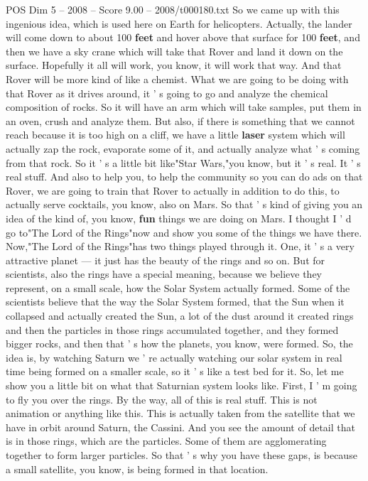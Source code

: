 \begin{textsample}{POS Dim 5 – 2008 – Score 9.00 – 2008/t000180.txt}
So we came up with this ingenious idea, which is used here on Earth for helicopters.
Actually, the lander will come down to about 100 \textbf{feet} and hover above that surface for 100 \textbf{feet}, and then we have a sky crane which will take that Rover and land it down on the surface.
Hopefully it all will work, you know, it will work that way.
And that Rover will be more kind of like a chemist.
What we are going to be doing with that Rover as it drives around, it ' s going to go and analyze the chemical composition of rocks.
So it will have an arm which will take samples, put them in an oven, crush and analyze them.
But also, if there is something that we cannot reach because it is too high on a cliff, we have a little \textbf{laser} system which will actually zap the rock, evaporate some of it, and actually analyze what ' s coming from that rock.
So it ' s a little bit like"Star Wars,"you know, but it ' s real.
It ' s real stuff.
And also to help you, to help the community so you can do ads on that Rover, we are going to train that Rover to actually in addition to do this, to actually serve cocktails, you know, also on Mars.
So that ' s kind of giving you an idea of the kind of, you know, \textbf{fun} things we are doing on Mars.
I thought I ' d go to"The Lord of the Rings"now and show you some of the things we have there.
Now,"The Lord of the Rings"has two things played through it.
One, it ' s a very attractive planet — it just has the beauty of the rings and so on.
But for scientists, also the rings have a special meaning, because we believe they represent, on a small scale, how the Solar System actually formed.
Some of the scientists believe that the way the Solar System formed, that the Sun when it collapsed and actually created the Sun, a lot of the dust around it created rings and then the particles in those rings accumulated together, and they formed bigger rocks, and then that ' s how the planets, you know, were formed.
So, the idea is, by watching Saturn we ' re actually watching our solar system in real time being formed on a smaller scale, so it ' s like a test bed for it.
So, let me show you a little bit on what that Saturnian system looks like.
First, I ' m going to fly you over the rings.
By the way, all of this is real stuff.
This is not animation or anything like this.
This is actually taken from the satellite that we have in orbit around Saturn, the Cassini.
And you see the amount of detail that is in those rings, which are the particles.
Some of them are agglomerating together to form larger particles.
So that ' s why you have these gaps, is because a small satellite, you know, is being formed in that location.

\end{textsample}
